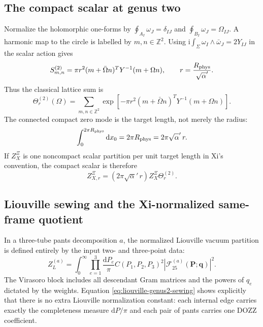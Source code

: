 \documentclass[11pt]{article}
\numberwithin{equation}{section}
\newcommand{\A}{\alpha'}
\newcommand{\dd}{\mathrm d}
\newcommand{\ii}{\mathrm i}
\newcommand{\cF}{\mathcal F}
\begin{document}
\subsection{The compact scalar at genus two}

Normalize the holomorphic one-forms by
$\oint_{A_I}\omega_J=\delta_{IJ}$ and
$\oint_{B_I}\omega_J=\Omega_{IJ}$.  A harmonic map to the circle is labelled
by $m,n\in\mathbb Z^2$.  Using
$\ii\int_\Sigma\omega_I\wedge\bar\omega_J=2Y_{IJ}$ in the scalar action gives
\begin{equation}
 S_{m,n}^{(2)}
 =\pi r^2(m+\bar\Omega n)^TY^{-1}(m+\Omega n),
 \qquad r=\frac{R_{\rm phys}}{\sqrt\A}.
 \label{eq:genus2-classical-action}
\end{equation}
Thus the classical lattice sum is
\begin{equation}
 \boxed{
 \Theta_r^{(2)}(\Omega)
 =\sum_{m,n\in\mathbb Z^2}
 \exp\!\left[-\pi r^2
 (m+\bar\Omega n)^TY^{-1}(m+\Omega n)\right].}
 \label{eq:theta-genus2-full}
\end{equation}
The connected compact zero mode is the target length, not merely the radius:
\begin{equation}
 \int_0^{2\pi R_{\rm phys}}\dd x_0=2\pi R_{\rm phys}
 =2\pi\sqrt\A\,r.
 \label{eq:genus2-compact-zero-mode}
\end{equation}
If $Z_X^\Xi$ is one noncompact scalar partition per unit target length in
Xi's convention, the compact scalar is therefore
\begin{equation}
 Z_{X,r}^\Xi=(2\pi\sqrt\A\,r)Z_X^\Xi\Theta_r^{(2)}.
 \label{eq:compact-from-noncompact}
\end{equation}

\subsection{Liouville sewing and the Xi-normalized same-frame quotient}

In a three-tube pants decomposition $a$, the normalized Liouville vacuum
partition is defined entirely by the input two- and three-point data:
\begin{equation}
 Z_L^{(a)}
 =\int_0^\infty\prod_{e=1}^3\frac{\dd P_e}{\pi}
 C(P_1,P_2,P_3)^2
 \left|\cF_{25}^{(a)}(\boldsymbol P;\boldsymbol q)\right|^2.
 \label{eq:liouville-genus2-sewing}
\end{equation}
The Virasoro block includes all descendant Gram matrices and the powers of
$q_e$ dictated by the weights.  Equation \eqref{eq:liouville-genus2-sewing}
shows explicitly that there is no extra Liouville normalization constant:
each internal edge carries exactly the completeness measure $\dd P/\pi$ and
each pair of pants carries one DOZZ coefficient.
\end{document}
